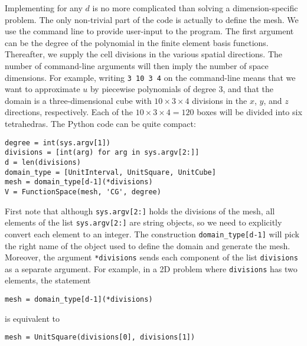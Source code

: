 Implementing  for any $d$ is no more
complicated than solving a dimension-specific problem.
The only non-trivial part of the code is actually to define the mesh.
We use the command line to provide user-input to the program. The first argument
can be the degree of the polynomial in the finite element basis functions.
Thereafter, we supply the
cell divisions in the various spatial directions. The number of
command-line arguments will then imply the number of space dimensions.
For example, writing {\fontsize{12pt}{12pt}\texttt{3 10 3 4}} on the command-line means that
we want to approximate $u$ by piecewise polynomials of degree 3,
and that the domain is a three-dimensional cube with $10\times 3\times 4$
divisions in the $x$, $y$, and $z$ directions, respectively.
Each of the $10\times 3\times 4 = 120$ boxes will
be divided into six tetrahedras.
The Python code can be quite compact:
\begin{Verbatim}[fontsize=\fontsize{10pt}{10pt},tabsize=8,baselinestretch=1.05,
fontfamily=tt,xleftmargin=7mm]
degree = int(sys.argv[1])
divisions = [int(arg) for arg in sys.argv[2:]]
d = len(divisions)
domain_type = [UnitInterval, UnitSquare, UnitCube]
mesh = domain_type[d-1](*divisions)
V = FunctionSpace(mesh, 'CG', degree)
\end{Verbatim}
\noindent
First note that although {\fontsize{12pt}{12pt}\texttt{sys.argv[2:]}} holds the divisions of
the mesh, all elements of the list {\fontsize{12pt}{12pt}\texttt{sys.argv[2:]}} are string objects,
so we need to explicitly convert each element to an integer.
The construction {\fontsize{12pt}{12pt}\verb!domain_type[d-1]!} will pick the right name of the
object used to define the domain and generate the mesh. 
Moreover, the argument {\fontsize{12pt}{12pt}\texttt{*divisions}}
sends each component of the list {\fontsize{12pt}{12pt}\texttt{divisions}} as a separate
argument. For example, in a 2D problem where {\fontsize{12pt}{12pt}\texttt{divisions}} has
two elements, the statement
\begin{Verbatim}[fontsize=\fontsize{10pt}{10pt},tabsize=8,baselinestretch=1.05,
fontfamily=tt,xleftmargin=7mm]
mesh = domain_type[d-1](*divisions)
\end{Verbatim}
\noindent
is equivalent to
\begin{Verbatim}[fontsize=\fontsize{10pt}{10pt},tabsize=8,baselinestretch=1.05,
fontfamily=tt,xleftmargin=7mm]
mesh = UnitSquare(divisions[0], divisions[1])
\end{Verbatim}
\noindent

